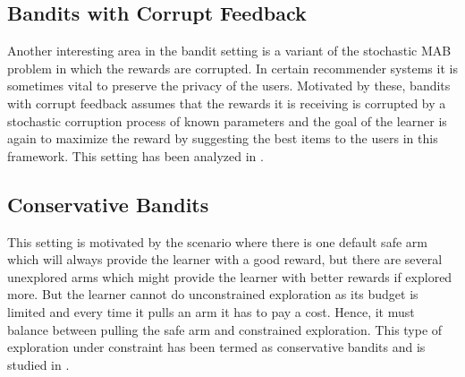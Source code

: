 \subsection{Bandits with Corrupt Feedback}

Another interesting area in the bandit setting is a variant of the stochastic MAB problem in which the
rewards are corrupted. In certain recommender systems it is sometimes vital to preserve the privacy of the users. Motivated by these, bandits with corrupt feedback assumes that the rewards it is receiving is corrupted by a stochastic corruption process of known parameters and the goal of the learner is again to maximize the reward by suggesting the best  items to the users in this framework. This setting has been analyzed in \citet{DBLP:journals/corr/abs-1708-05033}.


\subsection{Conservative Bandits}

This setting is motivated by the scenario where there is one default safe arm which will always provide the learner with a good reward, but there are several unexplored arms which might provide the learner with better rewards if explored more. But the learner cannot do unconstrained exploration as its budget is limited and every time it pulls an arm it has to pay a cost. Hence, it must balance between pulling the safe arm and constrained exploration. This type of exploration under constraint has been termed as conservative bandits and is studied in \citet{DBLP:conf/icml/WuSLS16} .